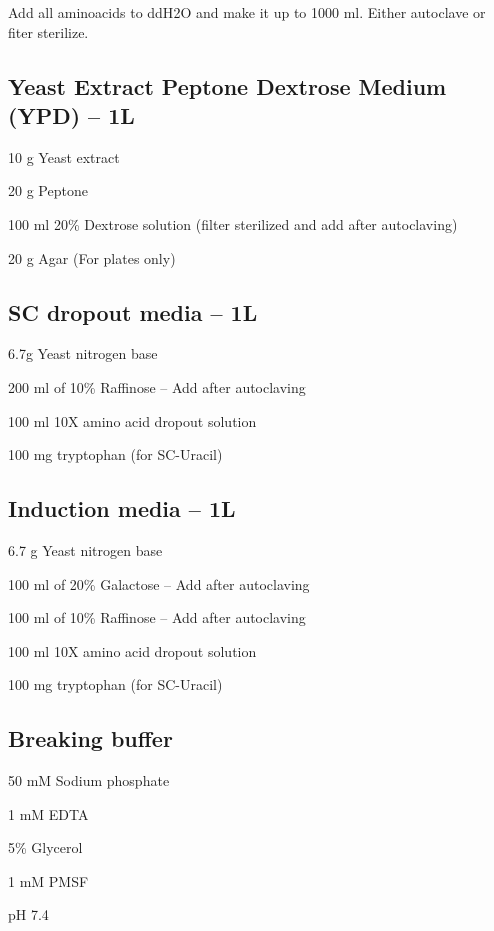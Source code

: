 			Add all aminoacids to ddH{\scriptsize2}O and make it up to 1000 ml. Either autoclave or fiter sterilize.
			
	\subsection{Yeast Extract Peptone Dextrose Medium (YPD) -- 1L}
	\begin{packed_enum}
	 	\item 10 g Yeast extract
		\item 20 g Peptone 
		\item 100 ml 20\% Dextrose solution (filter sterilized and add after autoclaving)
		\item 20 g Agar (For plates only)
	\end{packed_enum}

	\subsection{SC dropout media -- 1L}
	\begin{packed_enum}
	 	\item 6.7g Yeast nitrogen base
		\item 200 ml of 10\% Raffinose -- Add after autoclaving
		\item 100 ml 10X amino acid dropout solution
		\item 100 mg tryptophan (for SC-Uracil)
	\end{packed_enum}


	\subsection{Induction media -- 1L}
	\begin{packed_enum}
	 	\item 6.7 g Yeast nitrogen base
		\item 100 ml of 20\% Galactose -- Add after autoclaving
		\item 100 ml of 10\% Raffinose -- Add after autoclaving
		\item 100 ml 10X amino acid dropout solution
		\item 100 mg tryptophan (for SC-Uracil)
	\end{packed_enum}
	
	\subsection{Breaking buffer}
	\begin{packed_enum}
	\item 50 mM Sodium phosphate
	\item 1 mM EDTA
	\item 5\% Glycerol
	\item 1 mM PMSF
	\item pH 7.4
	
	\end{packed_enum}
